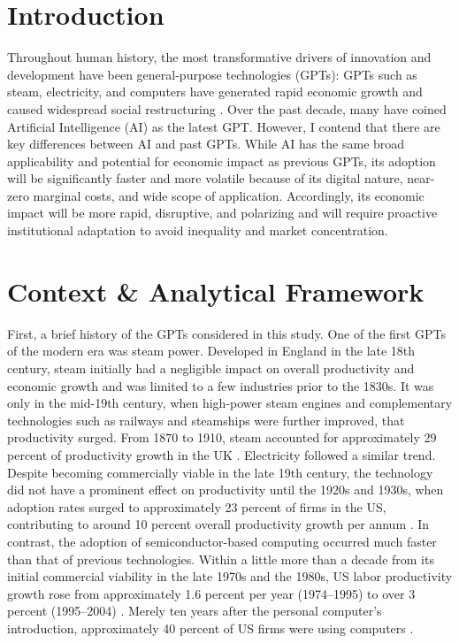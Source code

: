 
\section{Introduction}

Throughout human history, the most transformative drivers of innovation and development have been general-purpose technologies (GPTs): GPTs such as steam, electricity, and computers have generated rapid economic growth and caused widespread social restructuring \autocite[p.\ 0]{BresnahanTrajtenberg1995GPT}. Over the past decade, many have coined Artificial Intelligence (AI) as the latest GPT. However, I contend that there are key differences between AI and past GPTs. While AI has the same broad applicability and potential for economic impact as previous GPTs, its adoption will be significantly faster and more volatile because of its digital nature, near-zero marginal costs, and wide scope of application. Accordingly, its economic impact will be more rapid, disruptive, and polarizing and will require proactive institutional adaptation to avoid inequality and market concentration.

\section{Context \& Analytical Framework}

First, a brief history of the GPTs considered in this study. One of the first GPTs of the modern era was steam power. Developed in England in the late 18th century, steam initially had a negligible impact on overall productivity and economic growth and was limited to a few industries prior to the 1830s. It was only in the mid-19th century, when high-power steam engines and complementary technologies such as railways and steamships were further improved, that productivity surged. From 1870 to 1910, steam accounted for approximately 29 percent of productivity growth in the UK \autocite[p.\ 524]{Crafts2021AIasGPT}. Electricity followed a similar trend. Despite becoming commercially viable in the late 19th century, the technology did not have a prominent effect on productivity until the 1920s and 1930s, when adoption rates surged to approximately 23 percent of firms in the US, contributing to around 10 percent overall productivity growth per annum \autocite[pp.\ 16--17]{FilippucciGalLaengleSchief2025OECDG7ProductivityGainsAI}. In contrast, the adoption of semiconductor-based computing occurred much faster than that of previous technologies. Within a little more than a decade from its initial commercial viability in the late 1970s and the 1980s, US labor productivity growth rose from approximately 1.6 percent per year (1974–1995) to over 3 percent (1995–2004) \autocite[p.\ 525]{Crafts2021AIasGPT}. Merely ten years after the personal computer’s introduction, approximately 40 percent of US firms were using computers \autocite[p.\ 16]{FilippucciGalLaengleSchief2025OECDG7ProductivityGainsAI}.

